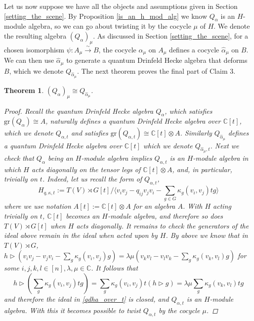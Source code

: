 \documentclass[10pt]{article}
\newcommand{\bb}{\medbreak}
\newcommand{\nt}{\noindent}
\newcommand{\Cc }{\mathbb{C}}
\newcommand{\xrt}{\xrightarrow}
\newcommand{\gr}{\text{gr}}
\newtheorem{theorem}[lemma]{Theorem}
\theoremstyle{definition}
\begin{document}
\nt Let us now suppose we have all the objects and assumptions given in Section \ref{setting_the_scene}. By Proposition \ref{is_an_h_mod_alg} we know $Q_\alpha$ is an $H$-module algebra, so we can go about twisting it by the cocycle $\mu$ of $H$. We denote the resulting algebra $(Q_\alpha)_\mu$. As discussed in Section \ref{setting_the_scene}, for a chosen isomorphism $\psi:A_\mu\xrt{\sim} B$, the cocycle $\alpha_\mu$ on $A_\mu$ defines a cocycle $\hat{\alpha}_\mu$ on $B$. We can then use $\hat{\alpha}_\mu$ to generate a quantum Drinfeld Hecke algebra that deforms $B$, which we denote $Q_{\hat{\alpha}_\mu}$. The next theorem proves the final part of Claim 3.

\begin{theorem}\label{the_main_result}
$(Q_\alpha)_\mu\cong Q_{\hat{\alpha}_\mu}$.

\begin{proof} %
Recall the quantum Drinfeld Hecke algebra $Q_\alpha$, which satisfies $\gr(Q_\alpha)\cong A$, naturally defines a quantum Drinfeld Hecke algebra over $\Cc[t]$, which we denote $Q_{\alpha,t}$ and satisfies $\gr(Q_{\alpha,t})\cong \Cc[t]\otimes A$. Similarly $Q_{\hat{\alpha}_\mu}$ defines a quantum Drinfeld Hecke algebra over $\Cc[t]$ which we denote $Q_{\hat{\alpha}_\mu , t}$. Next we check that $Q_\alpha$ being an $H$-module algebra implies $Q_{\alpha,t}$ is an $H$-module algebra in which $H$ acts diagonally on the tensor legs of $\Cc[t]\otimes A$, and, in particular, trivially on $t$. Indeed, let us recall the form of $Q_{\alpha,t}$, 
\begin{equation}\label{qdha_over_t}
  H_{q,\kappa,t}:=T(V)\rtimes G[t]/\langle v_i v_j-q_{ij}v_j v_i - \sum_{g\in G} \kappa_g (v_i,v_j)tg\rangle
\end{equation}
where we use notation $A[t]:=\Cc[t]\otimes A$ for an algebra $A$. With $H$ acting trivially on $t$, $\Cc[t]$ becomes an $H$-module algebra, and therefore so does $T(V)\rtimes G[t]$ when $H$ acts diagonally. It remains to check the generators of the ideal above remain in the ideal when acted upon by $H$. By above we know that in $T(V)\rtimes G$, $h\rhd (v_i v_j-v_j v_i-\sum_g\kappa_g(v_i,v_j)g)=\lambda\mu (v_kv_l-v_lv_k-\sum_g\kappa_g(v_k,v_l)g)$ for some $i,j,k,l\in [n], \lambda,\mu\in \Cc$. It follows that
$$h\rhd (\sum_g \kappa_g(v_i,v_j)tg)=\sum_g \kappa_g(v_i,v_j)t(h\rhd g)=\lambda\mu \sum_g \kappa_g (v_k,v_l)tg$$
and therefore the ideal in \eqref{qdha_over_t} is closed, and $Q_{\alpha,t}$ is an $H$-module algebra. With this it becomes possible to twist $Q_{\alpha,t}$ by the cocycle $\mu$.\bb
  

\end{proof}
\end{theorem}
\end{document}
